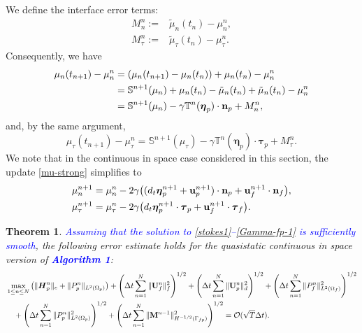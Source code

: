 \documentclass[11pt]{article}
\def\u{{\bf u}}
\def\n{{\bf n}}
\def\btau{\boldsymbol{\tau}}
\def\bbeta{\boldsymbol{\eta}}
\def\U{{\bf U}}
\def\M{{\bf M}}
\def\E{\boldsymbol{H}}
\def\dt{d_t}
\newtheorem{theorem}{Theorem}[section]
\begin{document}
We define the interface error terms:
\begin{subequations}
\begin{alignat}{1}
M_n^n :=& \tilde{\mu}_n(t_n) - \mu_n^n,\label{Mn}\\
M_{\tau}^{n} :=&  \tilde{\mu}_\tau(t_n) - \mu_\tau^n.\label{Mtau}
\end{alignat}
\end{subequations}
%
Consequently, we have
%
\begin{align}
\mu_n (t_{n+1}) - \mu_n^n &= (\mu_n (t_{n+1}) - \mu_n(t_n) )+ \mu_n(t_n) - \mu_n^n \nonumber\\
&= \mathbb{S}^{n+1} (\mu_n) + \mu_n(t_n) - \tilde{\mu}_n(t_n) + \tilde{\mu}_n(t_n) - \mu_n^n \nonumber \\
&= \mathbb{S}^{n+1}(\mu_n) - \gamma \mathbb{T}^n(\bbeta_p)\cdot \n_p + M_n^n \label{MnRelat},
\end{align}
%
and, by the same argument,
%
\begin{equation}\label{MtRelat}
\mu_\tau (t_{n+1}) - \mu_\tau^n = \mathbb{S}^{n+1}(\mu_\tau) - \gamma \mathbb{T}^n(\bbeta_p)\cdot \btau_p + M_\tau^n.
\end{equation}
%
{We note that in the continuous in space case considered in this section, the update \eqref{mu-strong} simplifies to}
%
\begin{subequations}\label{mu-strong-cont}  
\begin{align}
  \mu_n^{n+1}& = \mu_n^n - 2\gamma\big((\dt \bbeta_p^{n+1}
  + \u_p^{n+1})\cdot\n_p + \u_f^{n+1}\cdot\n_f\big),
  \label{mu-n-strong-cont} \\
  \mu_{\tau}^{n+1}  & = \mu_{\tau}^n - 2\gamma\big(
  \dt \bbeta_p^{n+1} \cdot\btau_p + \u_f^{n+1}\cdot\btau_f \big).
  \label{mu-t-strong-cont} 
\end{align}
\end{subequations}

{
\begin{theorem}
  \textcolor{blue}{Assuming that the solution to \eqref{stokes1}--\eqref{Gamma-fp-1} is sufficiently smooth}, the following error estimate holds for the quasistatic continuous in space version of \textcolor{blue}{{\bf Algorithm 1}}:
%
\begin{alignat}{1}
  & \max_{1\leq n \leq N}\big(
  \|\E_p^{n}\|_e
  + \|P_p^{n}\|_{L^2(\Omega_p)} 
  \big)
  + \left(\Delta t \sum_{n=1}^{N}\|\U_f^{n} \|_f^2\right)^{1/2}
  + \left(\Delta t \sum_{n=1}^{N} \| \U_p^{n}\|_d^2 \right)^{1/2}
  + \left(\Delta t \sum_{n=1}^{N}\|P_f^{n} \|_{L^2(\Omega_f)}^2 \right)^{1/2}
  \nonumber \\
  & \quad
  + \left(\Delta t \sum_{n=1}^{N}\|P_p^{n} \|_{L^2(\Omega_p)}^2 \right)^{1/2}
  + \left(\Delta t \sum_{n=1}^{N}\|\M^{n-1} \|_{H^{-1/2}(\Gamma_{fp})}^2 \right)^{1/2}
  = \mathcal{O}(\sqrt{T}\Delta t).
\label{error-estimate}
\end{alignat}  
\end{theorem}
}
\end{document}
